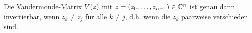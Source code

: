 \begin{corollary}
    Die Vandermonde-Matrix $V \! \left( z \right)$ mit
    $z = (z_0, \dots, z_{n-1}) \in \mathbb{C}^n$ ist genau dann invertierbar, wenn
    $z_k \neq z_j$ für alle $k \neq j$, d.h. wenn die $z_k$ paarweise
    verschieden sind.
\end{corollary}
